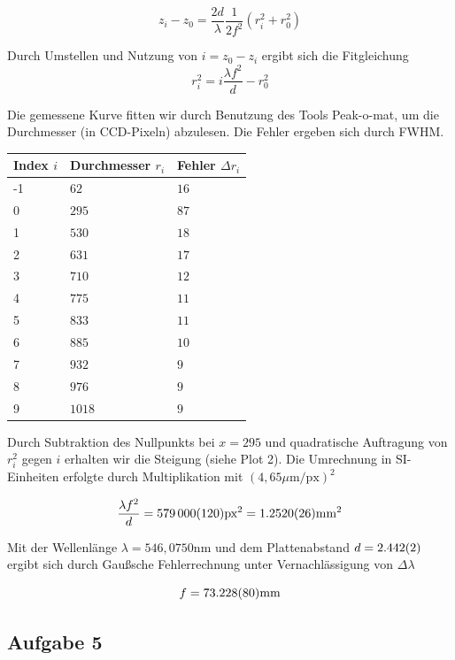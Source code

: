 \documentclass[a4paper,german,12pt,smallheadings]{scrartcl}
\begin{document}
\begin{equation}
  z_i - z_0 = \frac{2d}{\lambda} \frac{1}{2f^2} (r_i^2 + r_0^2)
\end{equation}

Durch Umstellen und Nutzung von $i = z_0 - z_i$ ergibt sich die Fitgleichung
\begin{equation}
  r_i^2 = i \frac{\lambda f^2}{d} - r_0^2
\end{equation}

Die gemessene Kurve fitten wir durch Benutzung des Tools Peak-o-mat, um die
Durchmesser (in CCD-Pixeln) abzulesen. Die Fehler ergeben sich durch FWHM.

\begin{tabular}{l|l|l}
  Index $i$ & Durchmesser $r_i$  & Fehler $\Delta r_i$ \\
  \hline
  -1 & $62$ & $16$ \\
  0 & $295$ & $87$ \\
  1 & $530$ & $18$ \\
  2 & $631$ & $17$ \\
  3 & $710$ & $12$ \\
  4 & $775$ & $11$ \\
  5 & $833$ & $11$ \\
  6 & $885$ & $10$ \\
  7 & $932$ & $9$  \\
  8 & $976$ & $9$  \\
  9 & $1018$ & $9$ \\
\end{tabular}

Durch Subtraktion des Nullpunkts bei $x=295$ und quadratische Auftragung von
$r_i^2$ gegen $i$ erhalten wir die Steigung (siehe Plot 2). Die Umrechnung in
SI-Einheiten erfolgte durch Multiplikation mit $(4{,}65 \mu\text{m}/\text{px})^2$

\begin{equation}
  \frac{\lambda f^2}{d} = \num{579000+-120} \text{px}^2 = \num{1.2520+-0.0026} \text{mm}^2
\end{equation}

Mit der Wellenlänge $\lambda = 546{,}0750 \text{nm}$ und dem Plattenabstand $d
= \num{2.442+-0.002}$ ergibt sich durch Gaußsche Fehlerrechnung unter
Vernachlässigung von $\Delta \lambda$

\begin{equation}
  f = \num{73.228+-0.08} \text{mm}
\end{equation}

\subsection{Aufgabe 5}
\end{document}
